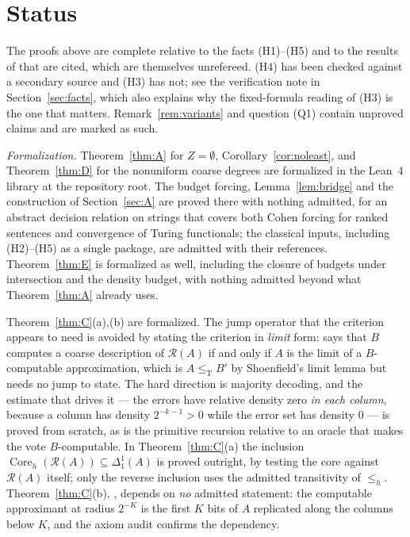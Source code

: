 \documentclass[11pt,letterpaper]{article}
\theoremstyle{definition}
\numberwithin{equation}{section}
\newcommand{\leT}{\le_{\mathrm T}}
\newcommand{\Rc}{\mathcal R}
\newcommand{\leh}{\le_{h}}
\newcommand{\Dh}{\Delta^1_1}
\newcommand{\Coreh}{\operatorname{Core}_h}
\begin{document}
\section{Status}\label{sec:status}
The proofs above are complete relative to the facts (H1)--(H5) and to the results of \cite{Synthesis} that are cited, which are themselves unrefereed. (H4) has been checked against a secondary source and (H3) has not; see the verification note in Section~\ref{sec:facts}, which also explains why the fixed-formula reading of (H3) is the one that matters. Remark~\ref{rem:variants} and question (Q1) contain unproved claims and are marked as such.

\emph{Formalization.} Theorem~\ref{thm:A} for $Z=\emptyset$, Corollary~\ref{cor:noleast}, and Theorem~\ref{thm:D} for the nonuniform coarse degrees are formalized in the Lean~4 library  at the repository root. The budget forcing, Lemma~\ref{lem:bridge} and the construction of Section~\ref{sec:A} are proved there with nothing admitted, for an abstract decision relation on strings that covers both Cohen forcing for ranked sentences and convergence of Turing functionals; the classical inputs, including (H2)--(H5) as a single package, are admitted with their references. Theorem~\ref{thm:E} is formalized as well, including the closure of budgets under intersection and the density budget, with nothing admitted beyond what Theorem~\ref{thm:A} already uses.

Theorem~\ref{thm:C}(a),(b) are formalized. The jump operator that the criterion appears to need is avoided by stating the criterion in \emph{limit} form:  says that $B$ computes a coarse description of $\Rc(A)$ if and only if $A$ is the limit of a $B$-computable approximation, which is $A\leT B'$ by Shoenfield's limit lemma but needs no jump to state. The hard direction is majority decoding, and the estimate that drives it --- the errors have relative density zero \emph{in each column}, because a column has density $2^{-k-1}>0$ while the error set has density $0$ --- is proved from scratch, as is the primitive recursion relative to an oracle that makes the vote $B$-computable. In Theorem~\ref{thm:C}(a) the inclusion $\Coreh(\Rc(A))\subseteq\Dh(A)$ is proved outright, by testing the core against $\Rc(A)$ itself; only the reverse inclusion uses the admitted transitivity of $\leh$. Theorem~\ref{thm:C}(b), , depends on \emph{no} admitted statement: the computable approximant at radius $2^{-K}$ is the first $K$ bits of $A$ replicated along the columns below $K$, and the axiom audit confirms the dependency.
\end{document}
